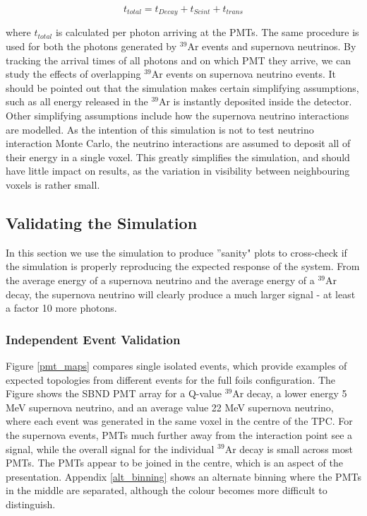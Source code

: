 \documentclass[a4paper]{article}
\begin{document}
\[  t_{total} = t_{Decay} + t_{Scint} + t_{trans} \]

\noindent where $t_{total}$ is calculated per photon arriving at the PMTs. The same procedure is used for both the photons generated by $^{39}$Ar events and supernova neutrinos. By tracking the arrival times of all photons and on which PMT they arrive, we can study the effects of overlapping $^{39}$Ar events on supernova neutrino events. It should be pointed out that the simulation makes certain simplifying assumptions, such as all energy released in the $^{39}$Ar is instantly deposited inside the detector. Other simplifying assumptions include how the supernova neutrino interactions are modelled. As the intention of this simulation is not to test neutrino interaction Monte Carlo, the neutrino interactions are assumed to deposit all of their energy in a single voxel. This greatly simplifies the simulation, and should have little impact on results, as the variation in visibility between neighbouring voxels is rather small.\\ %

\subsection{Validating the Simulation}

In this section we use the simulation to produce ''sanity" plots to cross-check if the simulation is properly reproducing the expected response of the system. From the average energy of a supernova neutrino and the average energy of a $^{39}$Ar decay, the supernova neutrino will clearly produce a much larger signal - at least a factor 10 more photons.

\subsubsection{Independent Event Validation}

Figure \ref{pmt_maps} compares single isolated events, which provide examples of expected topologies from different events for the full foils configuration. The Figure shows the SBND PMT array for a Q-value $^{39}$Ar decay, a lower energy 5 MeV supernova neutrino, and an average value 22 MeV supernova neutrino, where each event was generated in the same voxel in the centre of the TPC. For the supernova events, PMTs much further away from the interaction point see a signal, while the overall signal for the individual $^{39}$Ar decay is small across most PMTs. The PMTs appear to be joined in the centre, which is an aspect of the presentation. Appendix \ref{alt_binning} shows an alternate binning where the PMTs in the middle are separated, although the colour becomes more difficult to distinguish.
\end{document}
